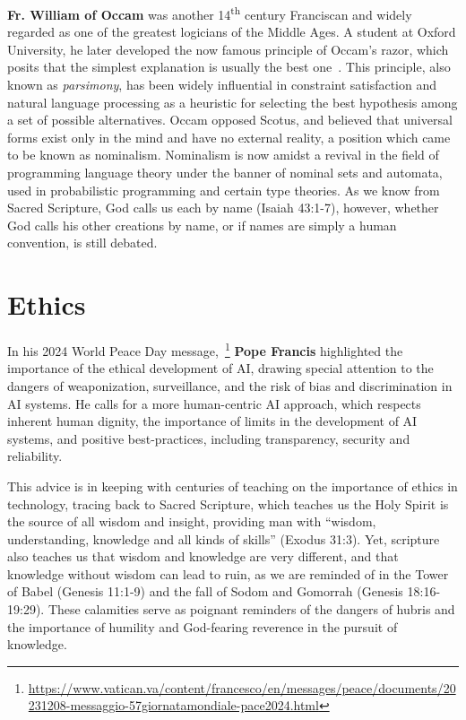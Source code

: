 \documentclass[sigplan,nonacm]{acmart}\settopmatter{printfolios=false,printccs=false,printacmref=false}
\begin{document}
  \textbf{Fr. William of Occam} was another 14\textsuperscript{th} century Franciscan and widely regarded as one of the greatest logicians of the Middle Ages. A student at Oxford University, he later developed the now famous principle of Occam's razor, which posits that the simplest explanation is usually the best one~\cite{occam1495quaestiones}. This principle, also known as \textit{parsimony}, has been widely influential in constraint satisfaction and natural language processing as a heuristic for selecting the best hypothesis among a set of possible alternatives. Occam opposed Scotus, and believed that universal forms exist only in the mind and have no external reality, a position which came to be known as nominalism. Nominalism is now amidst a revival in the field of programming language theory under the banner of nominal sets and automata, used in probabilistic programming and certain type theories. As we know from Sacred Scripture, God calls us each by name (Isaiah 43:1-7), however, whether God calls his other creations by name, or if names are simply a human convention, is still debated.

  \section{Ethics}

  In his 2024 World Peace Day message,~\footnote{\url{https://www.vatican.va/content/francesco/en/messages/peace/documents/20231208-messaggio-57giornatamondiale-pace2024.html}} \textbf{Pope Francis} highlighted the importance of the ethical development of AI, drawing special attention to the dangers of weaponization, surveillance, and the risk of bias and discrimination in AI systems. He calls for a more human-centric AI approach, which respects inherent human dignity, the importance of limits in the development of AI systems, and positive best-practices, including transparency, security and reliability.

  This advice is in keeping with centuries of teaching on the importance of ethics in technology, tracing back to Sacred Scripture, which teaches us the Holy Spirit is the source of all wisdom and insight, providing man with ``wisdom, understanding, knowledge and all kinds of skills'' (Exodus 31:3). Yet, scripture also teaches us that wisdom and knowledge are very different, and that knowledge without wisdom can lead to ruin, as we are reminded of in the Tower of Babel (Genesis 11:1-9) and the fall of Sodom and Gomorrah (Genesis 18:16-19:29). These calamities serve as poignant reminders of the dangers of hubris and the importance of humility and God-fearing reverence in the pursuit of knowledge.
\end{document}
